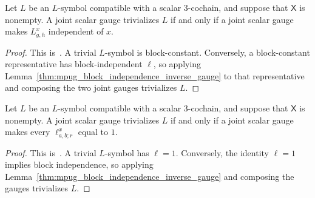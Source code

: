 \begin{lemma}
    \label{thm:mpug_trivial_iff_block_constant}
    \leanok
    Let $L$ be an $L$-symbol compatible with a scalar $3$-cochain,
    and suppose that $\mathsf X$ is nonempty. A joint scalar gauge trivializes
    $L$ if and only if a joint scalar gauge makes $L^x_{g,h}$ independent of
    $x$.
\end{lemma}

\begin{proof}\leanok
    This is~\cite[``Trivial and block-constant gauges'']{QICLean2026Blueprint}.
    A trivial $L$-symbol is block-constant. Conversely, a block-constant
    representative has block-independent $\ell$, so applying
    Lemma~\ref{thm:mpug_block_independence_inverse_gauge} to that
    representative and composing the two joint gauges trivializes $L$.
\end{proof}

\begin{lemma}
    \label{thm:mpug_trivial_iff_trivial_ell}
    \leanok
    Let $L$ be an $L$-symbol compatible with a scalar $3$-cochain,
    and suppose that $\mathsf X$ is nonempty. A joint scalar gauge trivializes
    $L$ if and only if a joint scalar gauge makes every
    $\ell^x_{a,b;r}$ equal to $1$.
\end{lemma}

\begin{proof}\leanok
    This is~\cite[``Trivial gauges and trivial block
        scalars'']{QICLean2026Blueprint}.
    A trivial $L$-symbol has $\ell=1$. Conversely, the identity $\ell=1$
    implies block independence, so applying
    Lemma~\ref{thm:mpug_block_independence_inverse_gauge} and composing the
    gauges trivializes $L$.
\end{proof}

